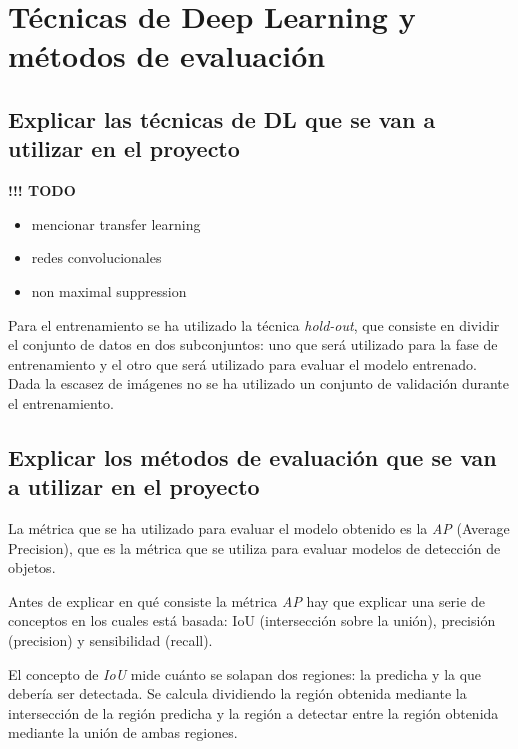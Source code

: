 \section{Técnicas de Deep Learning y métodos de evaluación}
\label{sec:tecnicas_de_deep_learning_y_metodos_de_evaluacion}

\subsection{Explicar las técnicas de DL que se van a utilizar en el proyecto}


{\color{red} \textbf{!!! TODO}}

\begin{itemize}
	\item mencionar transfer learning
	\item redes convolucionales
	\item non maximal suppression
\end{itemize}

Para el entrenamiento se ha utilizado la técnica \textit{hold-out}, que consiste en dividir el conjunto de datos en dos subconjuntos: uno que será utilizado para la fase de entrenamiento y el otro que será utilizado para evaluar el modelo entrenado. Dada la escasez de imágenes no se ha utilizado un conjunto de validación durante el entrenamiento.

\subsection{Explicar los métodos de evaluación que se van a utilizar en el proyecto}

La métrica que se ha utilizado para evaluar el modelo obtenido es la \textit{AP} (Average Precision), que es la métrica que se utiliza para evaluar modelos de detección de objetos.

Antes de explicar en qué consiste la métrica \textit{AP} hay que explicar una serie de conceptos en los cuales está basada: IoU (intersección sobre la unión), precisión (precision) y sensibilidad (recall).

El concepto de \textit{IoU} mide cuánto se solapan dos regiones: la predicha y la que debería ser detectada. Se calcula dividiendo la región obtenida mediante la intersección de la región predicha y la región a detectar entre la región obtenida mediante la unión de ambas regiones.


